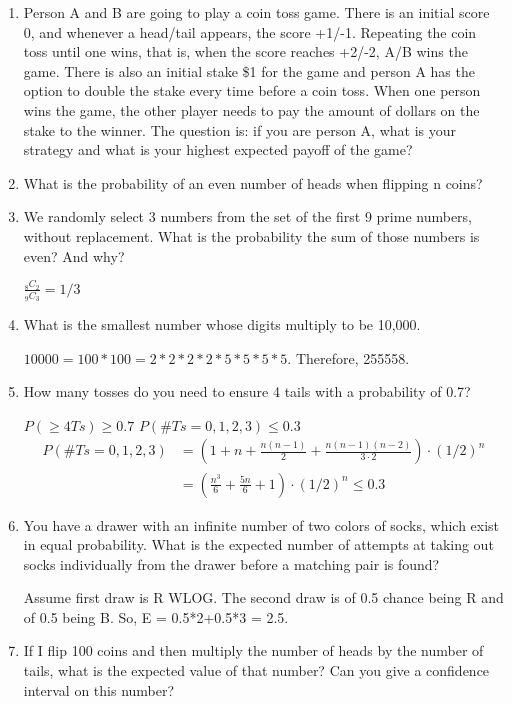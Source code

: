 \documentclass{article}
\begin{document}
\begin{enumerate}
    \item Person A and B are going to play a coin toss game. There is an initial score 0, and whenever a head/tail appears, the score +1/-1. Repeating the coin toss until one wins, that is, when the score reaches +2/-2, A/B wins the game. There is also an initial stake \$1 for the game and person A has the option to double the stake every time before a coin toss. When one person wins the game, the other player needs to pay the amount of dollars on the stake to the winner. The question is: if you are person A, what is your strategy and what is your highest expected payoff of the game?

    \item What is the probability of an even number of heads when flipping n coins?

    \item We randomly select 3 numbers from the set of the first 9 prime numbers, without replacement. What is the probability the sum of those numbers is even? And why?

    $\frac{_8C_2}{_9C_3} = 1/3$

    \item What is the smallest number whose digits multiply to be 10,000.
    
    $10000 = 100*100=2*2*2*2*5*5*5*5$. Therefore, 255558.

    \item How many tosses do you need to ensure 4 tails with a probability of 0.7?

    $P(\geq 4 Ts)\geq0.7$
    $P(\#Ts=0, 1,2,3) \leq 0.3 $
    \begin{align*}
        P(\#Ts=0, 1,2,3) &= \left(1+n+\frac{n(n-1)}{2}+\frac{n(n-1)(n-2)}{3\cdot 2}\right)\cdot(1/2)^n \\
        &=\left(\frac{n^3}{6} +\frac{5n}{6}+1\right)\cdot (1/2)^n \leq 0.3
    \end{align*}
    
     \item You have a drawer with an infinite number of two colors of socks, which exist in equal probability. What is the expected number of attempts at taking out socks individually from the drawer before a matching pair is found?

     Assume first draw is R WLOG. The second draw is of 0.5 chance being R and of 0.5 being B. So, E = 0.5*2+0.5*3 = 2.5. 

     \item If I flip 100 coins and then multiply the number of heads by the number of tails, what is the expected value of that number? Can you give a confidence interval on this number?


\end{enumerate}
\end{document}
